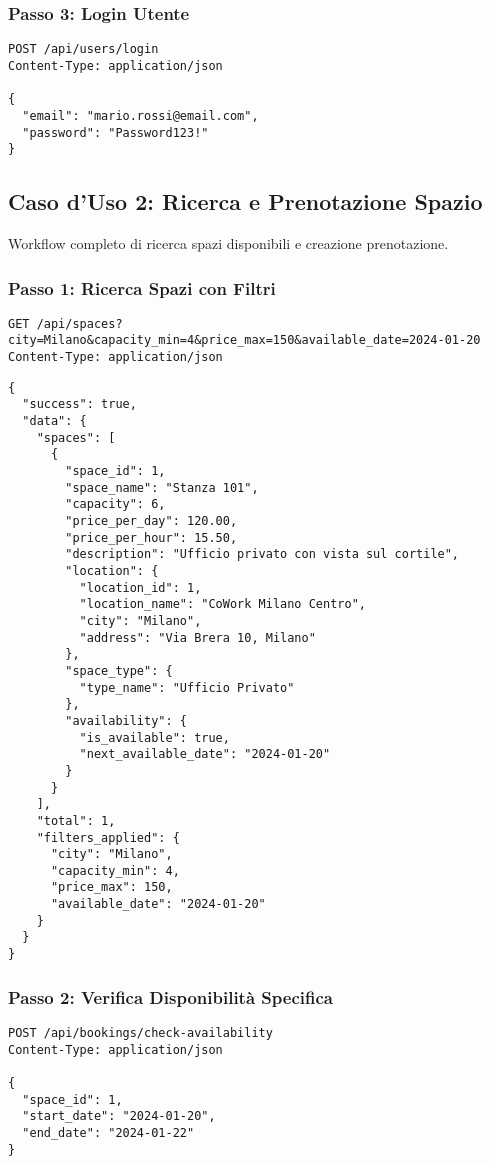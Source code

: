 \subsubsection{Passo 3: Login Utente}
\begin{lstlisting}[style=httpstyle, caption=Login Utente]
POST /api/users/login
Content-Type: application/json

{
  "email": "mario.rossi@email.com",
  "password": "Password123!"
}
\end{lstlisting}

\newpage

\subsection{Caso d'Uso 2: Ricerca e Prenotazione Spazio}
Workflow completo di ricerca spazi disponibili e creazione prenotazione.

\subsubsection{Passo 1: Ricerca Spazi con Filtri}
\begin{lstlisting}[style=httpstyle, caption=Ricerca Spazi Disponibili]
GET /api/spaces?city=Milano&capacity_min=4&price_max=150&available_date=2024-01-20
Content-Type: application/json
\end{lstlisting}

\begin{lstlisting}[caption=Risposta Spazi Disponibili]
{
  "success": true,
  "data": {
    "spaces": [
      {
        "space_id": 1,
        "space_name": "Stanza 101",
        "capacity": 6,
        "price_per_day": 120.00,
        "price_per_hour": 15.50,
        "description": "Ufficio privato con vista sul cortile",
        "location": {
          "location_id": 1,
          "location_name": "CoWork Milano Centro",
          "city": "Milano",
          "address": "Via Brera 10, Milano"
        },
        "space_type": {
          "type_name": "Ufficio Privato"
        },
        "availability": {
          "is_available": true,
          "next_available_date": "2024-01-20"
        }
      }
    ],
    "total": 1,
    "filters_applied": {
      "city": "Milano",
      "capacity_min": 4,
      "price_max": 150,
      "available_date": "2024-01-20"
    }
  }
}
\end{lstlisting}

\newpage

\subsubsection{Passo 2: Verifica Disponibilità Specifica}
\begin{lstlisting}[style=httpstyle, caption=Verifica Disponibilità Periodo]
POST /api/bookings/check-availability
Content-Type: application/json

{
  "space_id": 1,
  "start_date": "2024-01-20",
  "end_date": "2024-01-22"
}
\end{lstlisting}

